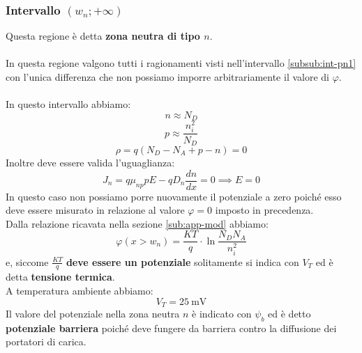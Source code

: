 \documentclass[../main.tex]{subfiles}
\begin{document}
	\subsubsection{Intervallo $(w_n; +\infty)$}
	\label{subsub:int-pn5}
	Questa regione è detta \textbf{zona neutra di tipo $n$}.\\\\
	In questa regione valgono tutti i ragionamenti visti nell'intervallo \ref{subsub:int-pn1} con l’unica differenza che non possiamo imporre arbitrariamente il valore di $\varphi$.\\\\
	In questo intervallo abbiamo:
	$$n\approx N_D$$
	$$p\approx\frac{n_i^2}{N_D}$$
	$$\rho=q\left(N_D-N_A+p-n\right)=0$$
	Inoltre deve essere valida l’uguaglianza:
	$$J_n=q\mu_{np}pE-qD_n\frac{dn}{dx}=0\implies E=0$$
	In questo caso non possiamo porre nuovamente il potenziale a zero poiché esso deve essere misurato in relazione al valore $\varphi=0$ imposto in precedenza. \\
	Dalla relazione ricavata nella sezione \ref{sub:app-mod} abbiamo:
	$$\varphi\left(x>w_n\right)=\frac{KT}{q}\cdot\ln\frac{N_D N_A}{n_i^2}$$
	e, siccome $\frac{KT}{q}$ \textbf{deve essere un potenziale} solitamente si indica con $V_T$ ed è detta \textbf{tensione termica}.\\
	A temperatura ambiente abbiamo:
	$$V_T=25 \ \mathrm{mV}$$
	Il valore del potenziale nella zona neutra $n$ è indicato con $\psi_b$ ed è detto \textbf{potenziale barriera} poiché deve fungere da barriera contro la diffusione dei portatori di carica.
\end{document}

